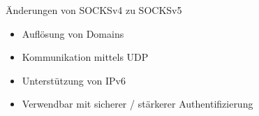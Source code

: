\documentclass[t]{beamer}
\begin{document}
  \begin{frame}{Änderungen von SOCKSv4 zu SOCKSv5}
	 \begin{itemize}
		\item
		Auflösung von Domains
		\item
		Kommunikation mittels UDP
		\item
		Unterstützung von IPv6
		\item
		Verwendbar mit sicherer / stärkerer Authentifizierung
  	\end{itemize}
  \end{frame}
\end{document}
